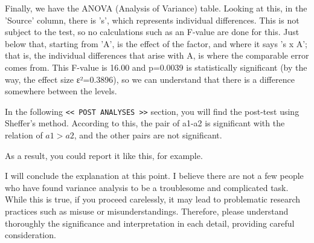 \documentclass{ltjbook}
\begin{document}

Finally, we have the ANOVA (Analysis of Variance) table. Looking at this, in the 'Source' column, there is 's', which represents individual differences. This is not subject to the test, so no calculations such as an F-value are done for this. Just below that, starting from 'A', is the effect of the factor, and where it says 's x A'; that is, the individual differences that arise with A, is where the comparable error comes from. This F-value is 16.00 and p=0.0039 is statistically significant (by the way, the effect size ε²=0.3896), so we can understand that there is a difference somewhere between the levels.

In the following \verb|<< POST ANALYSES >>| section, you will find the post-test using Sheffer's method. According to this, the pair of a1-a2 is significant with the relation of $a1 > a2$, and the other pairs are not significant.

As a result, you could report it like this, for example.


I will conclude the explanation at this point.
I believe there are not a few people who have found variance analysis to be a troublesome and complicated task. While this is true, if you proceed carelessly, it may lead to problematic research practices such as misuse or misunderstandings. Therefore, please understand thoroughly the significance and interpretation in each detail, providing careful consideration.
\end{document}
